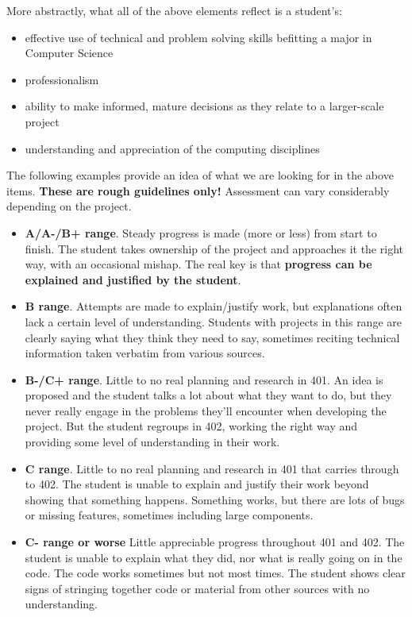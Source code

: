 \documentclass[nobib]{tufte-handout}
\begin{document}
More abstractly, what all of the above elements reflect is a student's:
\begin{itemize}
\item effective use of technical and problem solving skills befitting a major in Computer Science
\item professionalism
\item ability to make informed, mature decisions as they relate to a larger-scale project
\item understanding and appreciation of the computing disciplines
\end{itemize}

The following examples provide an idea of what we are looking for in
the above items. \textbf{These are rough guidelines only!} Assessment
can vary considerably depending on the project.

\begin{itemize}
\item \textbf{A/A-/B+ range}. Steady progress is made (more or less)
  from start to finish. The student takes ownership of the project and
  approaches it the right way, with an occasional mishap. The real key
  is that \textbf{progress can be explained and justified by the
    student}.
\item \textbf{B range}. Attempts are made to explain/justify work, but
  explanations often lack a certain level of understanding. Students
  with projects in this range are clearly saying what they think they
  need to say, sometimes reciting technical information taken verbatim
  from various sources.
\item \textbf{B-/C+ range}. Little to no real planning and research in
  401. An idea is proposed and the student talks a lot about what they
  want to do, but they never really engage in the problems they'll
  encounter when developing the project. But the student regroups in
  402, working the right way and providing some level of understanding
  in their work.
\item \textbf{C range}. Little to no real planning and research in 401
  that carries through to 402. The student is unable to explain and
  justify their work beyond showing that something happens. Something
  works, but there are lots of bugs or missing features, sometimes
  including large components.
\item \textbf{C- range or worse} Little appreciable progress
  throughout 401 and 402. The student is unable to explain what they
  did, nor what is really going on in the code. The code works
  sometimes but not most times. The student shows clear signs of
  stringing together code or material from other sources with no
  understanding.
\end{itemize}
\end{document}
